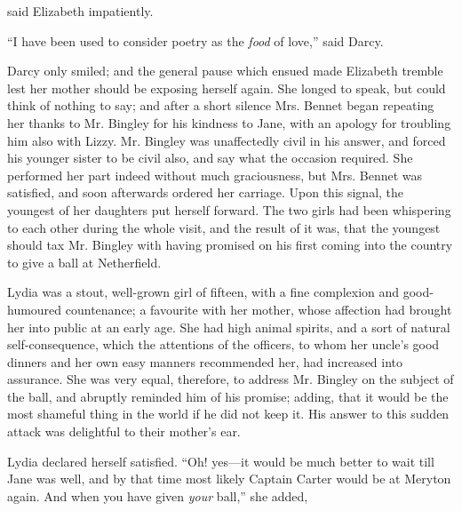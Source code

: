  said Elizabeth impatiently. 

“I have been used to consider poetry as the {\em food} of love,” said Darcy.


Darcy only smiled; and the general pause which ensued made Elizabeth tremble lest her mother should be exposing herself again. She longed to speak, but could think of nothing to say; and after a short silence Mrs. Bennet began repeating her thanks to Mr. Bingley for his kindness to Jane, with an apology for troubling him also with Lizzy. Mr. Bingley was unaffectedly civil in his answer, and forced his younger sister to be civil also, and say what the occasion required. She performed her part indeed without much graciousness, but Mrs. Bennet was satisfied, and soon afterwards ordered her carriage. Upon this signal, the youngest of her daughters put herself forward. The two girls had been whispering to each other during the whole visit, and the result of it was, that the youngest should tax Mr. Bingley with having promised on his first coming into the country to give a ball at Netherfield.

Lydia was a stout, well-grown girl of fifteen, with a fine complexion and good-humoured countenance; a favourite with her mother, whose affection had brought her into public at an early age. She had high animal spirits, and a sort of natural self-consequence, which the attentions of the officers, to whom her uncle's good dinners and her own easy manners recommended her, had increased into assurance. She was very equal, therefore, to address Mr. Bingley on the subject of the ball, and abruptly reminded him of his promise; adding, that it would be the most shameful thing in the world if he did not keep it. His answer to this sudden attack was delightful to their mother's ear.


Lydia declared herself satisfied. “Oh! yes---it would be much better to wait till Jane was well, and by that time most likely Captain Carter would be at Meryton again. And when you have given {\em your} ball,” she added, 

